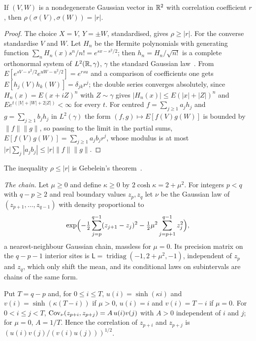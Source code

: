 \begin{lemma}[Gebelein]\label{lem:gebelein}
If $(V,W)$ is a nondegenerate Gaussian vector in $\mathbb{R}^2$ with correlation
coefficient $r$, then $\rho(\sigma(V),\sigma(W))=|r|$.
\end{lemma}

\begin{proof}
The choice $X=V$, $Y=\pm W$, standardised, gives $\rho\ge|r|$. For the converse
standardise $V$ and $W$. Let $H_n$ be the Hermite polynomials with generating
function $\sum_nH_n(x)s^n/n!=e^{sx-s^2/2}$; then $h_n=H_n/\sqrt{n!}$ is a
complete orthonormal system of $L^2(\mathbb{R},\gamma)$, $\gamma$ the standard Gaussian
law~\cite[Sec.~1.1.1]{Nua06}. From $E[e^{sV-s^2/2}e^{uW-u^2/2}]=e^{rsu}$ and a
comparison of coefficients one gets $E[h_j(V)h_k(W)]=\delta_{jk}r^j$; the double
series converges absolutely, since $H_n(x)=E(x+iZ)^n$ with $Z\sim\gamma$ gives
$|H_n(x)|\le E(|x|+|Z|)^n$ and $Ee^{t(|V|+|W|+2|Z|)}<\infty$ for every $t$.
For centred $f=\sum_{j\ge1}a_jh_j$ and $g=\sum_{j\ge1}b_jh_j$ in $L^2(\gamma)$
the form $(f,g)\mapsto E[f(V)g(W)]$ is bounded by $\|f\|\|g\|$, so passing to
the limit in the partial sums, $E[f(V)g(W)]=\sum_{j\ge1}a_jb_jr^j$, whose
modulus is at most $|r|\sum_j|a_jb_j|\le|r|\|f\|\|g\|$.
\end{proof}

The inequality $\rho\le|r|$ is Gebelein's theorem~\cite{Geb41}.

\emph{The chain.} Let $\mu\ge0$ and define $\kappa\ge0$ by $2\cosh\kappa=2+
\mu^2$. For integers $p<q$ with $q-p\ge2$ and real boundary values $z_p,z_q$ let
$\nu$ be the Gaussian law of $(z_{p+1},\dots,z_{q-1})$ with density proportional
to
\[
\exp\Bigl(-\tfrac12\sum_{j=p}^{q-1}(z_{j+1}-z_j)^2-\tfrac12\mu^2\sum_{j=p+1}^{q-1}
z_j^2\Bigr),
\]
a nearest-neighbour Gaussian chain, massless for $\mu=0$. Its precision matrix
on the $q-p-1$ interior sites is $\mathsf L=\operatorname{tridiag}(-1,2+\mu^2,
-1)$, independent of $z_p$ and $z_q$, which only shift the mean, and its
conditional laws on subintervals are chains of the same form.

\begin{lemma}\label{lem:green}
Put $T=q-p$ and, for $0\le i\le T$, $u(i)=\sinh(\kappa i)$ and $v(i)=\sinh(
\kappa(T-i))$ if $\mu>0$, $u(i)=i$ and $v(i)=T-i$ if $\mu=0$. For $0<i\le j<T$,
$\operatorname{Cov}_\nu(z_{p+i},z_{p+j})=A\,u(i)v(j)$ with $A>0$ independent of $i$ and $j$;
for $\mu=0$, $A=1/T$. Hence the correlation of $z_{p+i}$ and $z_{p+j}$ is
$(u(i)v(j)/(v(i)u(j)))^{1/2}$.
\end{lemma}

